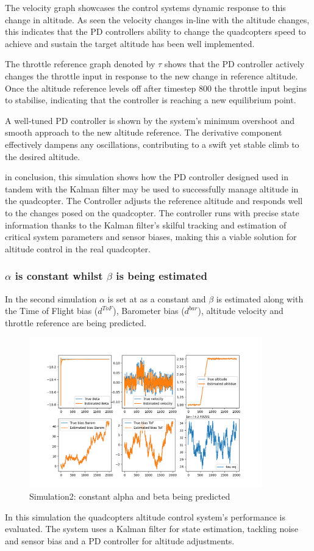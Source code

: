 \documentclass{article}
\begin{document}
The velocity graph showcases the control systems dynamic response to this change
in altitude. As seen the velocity changes in-line with the altitude changes,
this indicates that the PD controllers ability to change the quadcopters speed
to achieve and sustain the target altitude has been well implemented.

The throttle reference graph denoted by \(\tau\) shows that the PD controller
actively changes the throttle input in response to the new change in reference
altitude. Once the altitude reference levels off after timestep 800 the throttle
input begins to stabilise, indicating that the controller is reaching a new
equilibrium point.
 
A well-tuned PD controller is shown by the system's minimum overshoot and smooth
approach to the new altitude reference. The derivative component effectively
dampens any oscillations, contributing to a swift yet stable climb to the
desired altitude.

in conclusion, this simulation shows how the PD controller designed used in
tandem with the Kalman filter may be used to successfully manage altitude in the
quadcopter. The Controller adjusts the reference altitude and responds well to
the changes posed on the quadcopter. The controller runs with precise state
information thanks to the Kalman filter's skilful tracking and estimation of
critical system parameters and sensor biases, making this a viable solution for
altitude control in the real quadcopter.



\subsubsection*{\(\alpha\) is constant whilst \(\beta\) is being estimated}
In the second simulation \(\alpha\) is set at as a constant and \(\beta\) is
estimated along with the Time of Flight bias (\(d^{ToF}\)), Barometer bias
(\(d^{bar}\)), altitude velocity and throttle reference are being predicted.
\begin{figure}[H]
  \centering
  \includegraphics[width=0.9\textwidth]{Pictures/a_constant_PD.png}
  \caption{Simulation2: constant alpha and beta being predicted}
  \label{fig:a_constant_PD}
\end{figure}
In this simulation the quadcopters altitude control system's performance is
evaluated. The system uses a Kalman filter for state estimation, tackling noise
and sensor bias and a PD controller for altitude adjustments.
\end{document}
